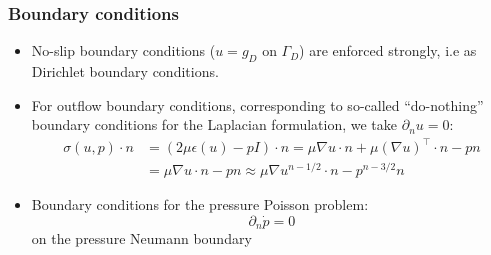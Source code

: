 \begin{frame}
  \frametitle{Boundary conditions}

  \begin{itemize}
  \item
    No-slip boundary conditions ($u = g_D$ on $\Gamma_D$) are enforced
    strongly, i.e as Dirichlet boundary conditions.
  \item
    For outflow boundary conditions, corresponding to so-called
    ``do-nothing'' boundary conditions for the Laplacian formulation,
    we take $\partial_n u = 0$:
    \begin{align*}
      \sigma(u, p) \cdot n
      &= (2\mu \epsilon(u) - pI) \cdot n
      = \mu\nabla u \cdot n + \mu(\nabla u)^{\top} \cdot n - pn \\
      &= \mu\nabla u \cdot n - pn
      \approx \mu\nabla u^{n-1/2} \cdot n - p^{n-3/2}n
    \end{align*}
  \end{itemize}

  \begin{itemize}
  \item
    Boundary conditions for the pressure Poisson problem:
    \begin{equation*}
      \partial_n \dot{p} = 0
    \end{equation*}
    on the pressure Neumann boundary
  \end{itemize}

\end{frame}
